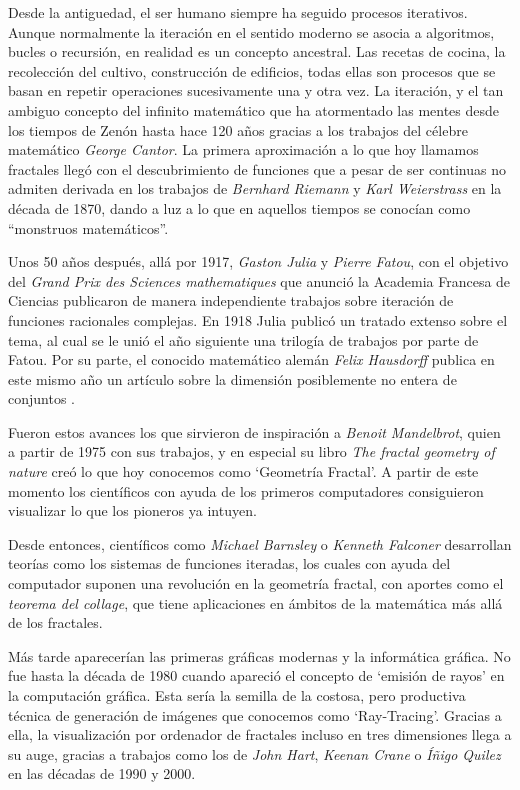 
Desde la antiguedad, el ser humano siempre ha seguido procesos iterativos. Aunque normalmente la iteración en el sentido moderno se asocia a algoritmos, bucles o recursión, en realidad es un concepto ancestral. Las recetas de cocina, la recolección del cultivo, construcción de edificios, todas ellas son procesos que se basan en repetir operaciones sucesivamente una y otra vez. La iteración, y el tan ambiguo concepto del infinito matemático que ha atormentado las mentes desde los tiempos de Zenón hasta hace 120 años gracias a los trabajos del célebre matemático \textit{George Cantor}. La primera aproximación a lo que hoy llamamos fractales llegó con el descubrimiento de funciones que a pesar de ser continuas no admiten derivada en los trabajos de \textit{Bernhard Riemann} y \textit{Karl Weierstrass} en la década de 1870, dando a luz a lo que en aquellos tiempos se conocían como ``monstruos matemáticos''.

Unos 50 años después, allá por 1917, \textit{Gaston Julia} y \textit{Pierre Fatou}, con el objetivo del \textit{Grand Prix des Sciences mathematiques} que anunció la Academia Francesa de Ciencias publicaron de manera independiente trabajos sobre iteración de funciones racionales complejas. En 1918 Julia publicó un tratado extenso sobre el tema, al cual se le unió el año siguiente una trilogía de trabajos por parte de Fatou. Por su parte, el conocido matemático alemán \textit{Felix Hausdorff} publica en este mismo año un artículo sobre la dimensión posiblemente no entera de conjuntos \cite{Hausdorff1919}. 

Fueron estos avances los que sirvieron de inspiración a \textit{Benoit Mandelbrot}, quien a partir de 1975 con sus trabajos, y en especial su libro \textit{The fractal geometry of nature} \cite{alma991007242979704990} creó lo que hoy conocemos como `Geometría Fractal'. A partir de este momento los científicos con ayuda de los primeros computadores consiguieron visualizar lo que los pioneros ya intuyen.

Desde entonces, científicos como \textit{Michael Barnsley} o \textit{Kenneth Falconer} desarrollan teorías como los sistemas de funciones iteradas, los cuales con ayuda del computador suponen una revolución en la geometría fractal, con aportes como el \textit{teorema del collage}, que tiene aplicaciones en ámbitos de la matemática más allá de los fractales. 

Más tarde aparecerían las primeras gráficas modernas y la informática gráfica. No fue hasta la década de 1980 cuando apareció el concepto de `emisión de rayos' en la computación gráfica. Esta sería la semilla de la costosa, pero productiva técnica de generación de imágenes que conocemos como `Ray-Tracing'. Gracias a ella, la visualización por ordenador de fractales incluso en tres dimensiones llega a su auge, gracias a trabajos como los de \textit{John Hart}, \textit{Keenan Crane} o \textit{Íñigo Quilez} en las décadas de 1990 y 2000.

